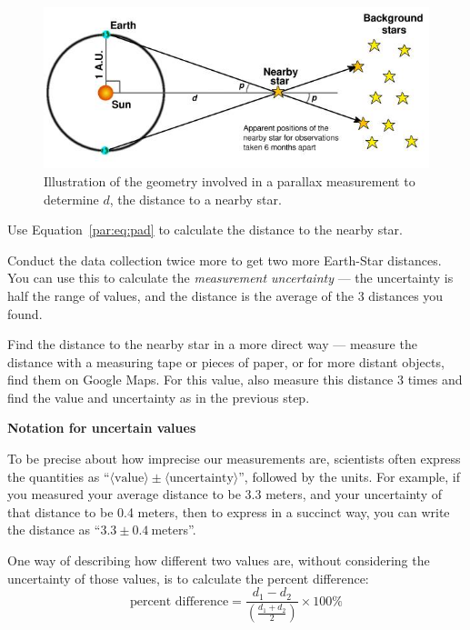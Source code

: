\begin{figure}
	\includegraphics[width=\textwidth]{parallax/parallax-figure}
	\caption{Illustration of the geometry involved in a parallax measurement to determine $d$, the distance to a nearby star.}\label{par:fig:figure}
\end{figure}

\begin{steps}
	\item Use Equation\ \ref{par:eq:pad} to calculate the distance to the nearby star.
	
	\item Conduct the data collection twice more to get two more Earth-Star distances. You can use this to calculate the \textit{measurement uncertainty} --- the uncertainty is half the range of values, and the distance is the average of the 3 distances you found.
	
	\item Find the distance to the nearby star in a more direct way --- measure the distance with a measuring tape or pieces of paper, or for more distant objects, find them on Google Maps.
	For this value, also measure this distance 3 times and find the value and uncertainty as in the previous step.
\end{steps}

\begin{framed}
	\textbf{Notation for uncertain values}
	
To be precise about how imprecise our measurements are, scientists often express the quantities as ``$\langle \textrm{value} \rangle \pm \langle \textrm{uncertainty} \rangle$'', followed by the units. For example, if you measured your average distance to be 3.3 meters, and your uncertainty of that distance to be 0.4 meters, then to express in a succinct way, you can write the distance as ``$3.3 \pm 0.4\:$meters''.
\end{framed}

One way of describing how different two values are, without considering the uncertainty of those values, is to calculate the percent difference:
\begin{equation}
\textrm{percent difference} = \frac{d_1 - d_2}{\left(\frac{d_1+d_2}{2}\right)} \times 100\%
\end{equation}

